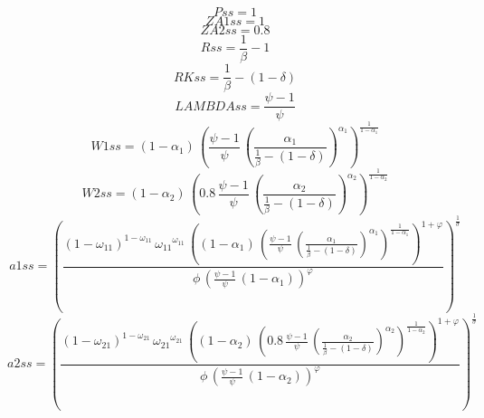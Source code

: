 \begin{dmath*}
Pss = 1
\end{dmath*}
\begin{dmath*}
ZA1ss = 1
\end{dmath*}
\begin{dmath*}
ZA2ss = 0.8
\end{dmath*}
\begin{dmath*}
Rss = \frac{1}{{{\beta}}}-1
\end{dmath*}
\begin{dmath*}
RKss = \frac{1}{{{\beta}}}-\left(1-{{\delta}}\right)
\end{dmath*}
\begin{dmath*}
LAMBDAss = \frac{{{\psi}}-1}{{{\psi}}}
\end{dmath*}
\begin{dmath*}
W1ss = \left(1-{{\alpha_{1}}}\right)\, \left(\frac{{{\psi}}-1}{{{\psi}}}\, \left(\frac{{{\alpha_{1}}}}{\frac{1}{{{\beta}}}-\left(1-{{\delta}}\right)}\right)^{{{\alpha_{1}}}}\right)^{\frac{1}{1-{{\alpha_{1}}}}}
\end{dmath*}
\begin{dmath*}
W2ss = \left(1-{{\alpha_{2}}}\right)\, \left(0.8\, \frac{{{\psi}}-1}{{{\psi}}}\, \left(\frac{{{\alpha_{2}}}}{\frac{1}{{{\beta}}}-\left(1-{{\delta}}\right)}\right)^{{{\alpha_{2}}}}\right)^{\frac{1}{1-{{\alpha_{2}}}}}
\end{dmath*}
\begin{dmath*}
a1ss = \left(\frac{\left(1-{{\omega_{11}}}\right)^{1-{{\omega_{11}}}}\, {{\omega_{11}}}^{{{\omega_{11}}}}\, \left(\left(1-{{\alpha_{1}}}\right)\, \left(\frac{{{\psi}}-1}{{{\psi}}}\, \left(\frac{{{\alpha_{1}}}}{\frac{1}{{{\beta}}}-\left(1-{{\delta}}\right)}\right)^{{{\alpha_{1}}}}\right)^{\frac{1}{1-{{\alpha_{1}}}}}\right)^{1+{{\varphi}}}}{{{\phi}}\, \left(\frac{{{\psi}}-1}{{{\psi}}}\, \left(1-{{\alpha_{1}}}\right)\right)^{{{\varphi}}}}\right)^{\frac{1}{{{\sigma}}}}
\end{dmath*}
\begin{dmath*}
a2ss = \left(\frac{\left(1-{{\omega_{21}}}\right)^{1-{{\omega_{21}}}}\, {{\omega_{21}}}^{{{\omega_{21}}}}\, \left(\left(1-{{\alpha_{2}}}\right)\, \left(0.8\, \frac{{{\psi}}-1}{{{\psi}}}\, \left(\frac{{{\alpha_{2}}}}{\frac{1}{{{\beta}}}-\left(1-{{\delta}}\right)}\right)^{{{\alpha_{2}}}}\right)^{\frac{1}{1-{{\alpha_{2}}}}}\right)^{1+{{\varphi}}}}{{{\phi}}\, \left(\frac{{{\psi}}-1}{{{\psi}}}\, \left(1-{{\alpha_{2}}}\right)\right)^{{{\varphi}}}}\right)^{\frac{1}{{{\sigma}}}}
\end{dmath*}
